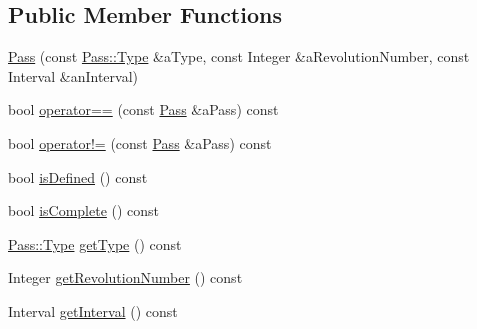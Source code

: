\subsection*{Public Member Functions}
\begin{DoxyCompactItemize}
\item 
\hyperlink{classostk_1_1astro_1_1trajectory_1_1orbit_1_1_pass_a682027335b521d6407d5ce77bd2390ec}{Pass} (const \hyperlink{classostk_1_1astro_1_1trajectory_1_1orbit_1_1_pass_a74449dbd104c6a24462b373cc55febcc}{Pass\+::\+Type} \&a\+Type, const Integer \&a\+Revolution\+Number, const Interval \&an\+Interval)
\item 
bool \hyperlink{classostk_1_1astro_1_1trajectory_1_1orbit_1_1_pass_ad2980a78e9a34cc95c906d72839450a0}{operator==} (const \hyperlink{classostk_1_1astro_1_1trajectory_1_1orbit_1_1_pass}{Pass} \&a\+Pass) const
\item 
bool \hyperlink{classostk_1_1astro_1_1trajectory_1_1orbit_1_1_pass_ab5b73ab2c54e082774dc9cc16ad5097f}{operator!=} (const \hyperlink{classostk_1_1astro_1_1trajectory_1_1orbit_1_1_pass}{Pass} \&a\+Pass) const
\item 
bool \hyperlink{classostk_1_1astro_1_1trajectory_1_1orbit_1_1_pass_acaf286ca5433a63f9e6e7b226cde7b81}{is\+Defined} () const
\item 
bool \hyperlink{classostk_1_1astro_1_1trajectory_1_1orbit_1_1_pass_af25e2c67077dbe78999af64bae0a6f83}{is\+Complete} () const
\item 
\hyperlink{classostk_1_1astro_1_1trajectory_1_1orbit_1_1_pass_a74449dbd104c6a24462b373cc55febcc}{Pass\+::\+Type} \hyperlink{classostk_1_1astro_1_1trajectory_1_1orbit_1_1_pass_a059f8209971303cc8961a747e690258e}{get\+Type} () const
\item 
Integer \hyperlink{classostk_1_1astro_1_1trajectory_1_1orbit_1_1_pass_abfc538f6a638420298886228f972855d}{get\+Revolution\+Number} () const
\item 
Interval \hyperlink{classostk_1_1astro_1_1trajectory_1_1orbit_1_1_pass_a1a3230564b8f40bd878194befeabef1a}{get\+Interval} () const
\end{DoxyCompactItemize}
